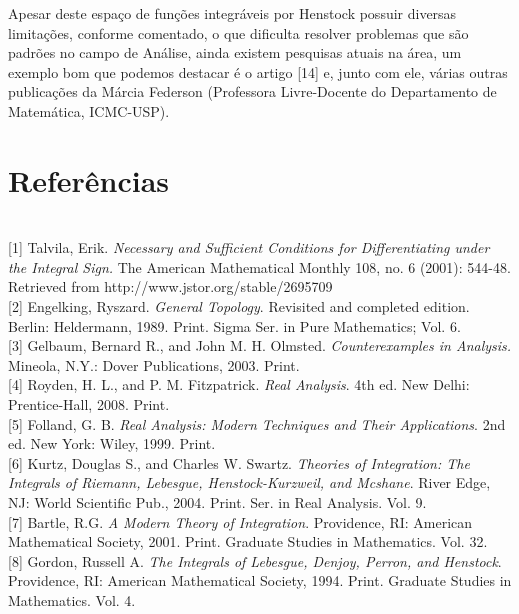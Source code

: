 \documentclass[12pt, a4paper]{article}
\theoremstyle{definition}
\begin{document}
Apesar deste espaço de funções integráveis por Henstock possuir diversas limitações, conforme comentado, o que dificulta resolver problemas que são padrões no campo de Análise, ainda existem pesquisas atuais na área, um exemplo bom que podemos destacar é o artigo [14] e, junto com ele, várias outras publicações da Márcia Federson (Professora Livre-Docente do Departamento de Matemática, ICMC-USP).  

\section{Referências}

\ \\

[1] Talvila, Erik. \textit{Necessary and Sufficient Conditions for Differentiating under the Integral Sign.} The American Mathematical Monthly 108, no. 6 (2001): 544-48. Retrieved from http://www.jstor.org/stable/2695709 \\

[2] Engelking, Ryszard. \textit{General Topology}. Revisited and completed edition. Berlin: Heldermann, 1989. Print. Sigma Ser. in Pure Mathematics; Vol. 6. \\

[3] Gelbaum, Bernard R., and John M. H. Olmsted.\textit{ Counterexamples in Analysis.} Mineola, N.Y.: Dover Publications, 2003. Print. \\

[4] Royden, H. L., and P. M. Fitzpatrick. \textit{Real Analysis}. 4th ed. New Delhi: Prentice-Hall, 2008. Print. \\

[5] Folland, G. B.\textit{ Real Analysis: Modern Techniques and Their Applications}. 2nd ed. New York: Wiley, 1999. Print. \\

[6] Kurtz, Douglas S., and Charles W. Swartz. \textit{Theories of Integration: The Integrals of Riemann, Lebesgue, Henstock-Kurzweil, and Mcshane}. River Edge, NJ: World Scientific Pub., 2004. Print. Ser. in Real Analysis. Vol. 9. \\

[7] Bartle, R.G. \textit{A Modern Theory of Integration}. Providence, RI: American Mathematical Society, 2001. Print. Graduate Studies in Mathematics. Vol. 32. \\

[8] Gordon, Russell A. \textit{The Integrals of Lebesgue, Denjoy, Perron, and Henstock}. Providence, RI: American Mathematical Society, 1994. Print. Graduate Studies in Mathematics. Vol. 4. \\
 
\end{document}
